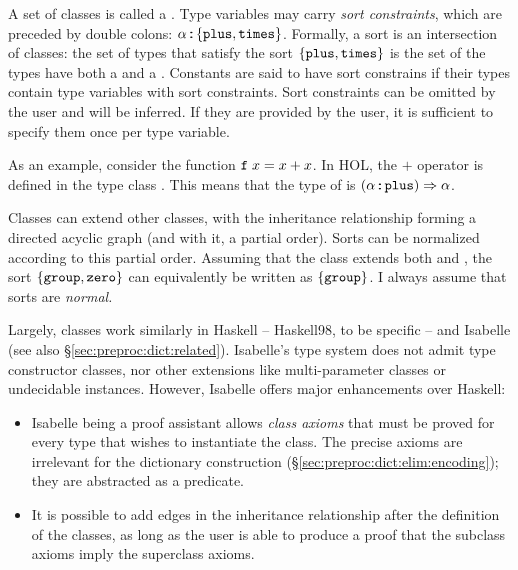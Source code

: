 A set of classes is called a .
Type variables may carry \emph{sort constraints}, which are preceded by double colons: $\alpha \mathbin{:\!\!:} \{ \texttt{\textup{plus}}, \texttt{\textup{times}} \}$.
Formally, a sort is an intersection of classes: the set of types that satisfy the sort $\{ \texttt{\textup{plus}}, \texttt{\textup{times}} \}$ is the set of the types have both a  and a  .
Constants are said to have sort constrains if their types contain type variables with sort constraints.
Sort constraints can be omitted by the user and will be inferred.
If they are provided by the user, it is sufficient to specify them once per type variable.

As an example, consider the function $\texttt{\textup{f}}\;x = x + x$.
In HOL, the $+$ operator is defined in the type class .
This means that the type of  is $(\alpha \mathbin{:\!\!:} \texttt{\textup{plus}}) \Rightarrow \alpha$.

Classes can extend other classes, with the inheritance relationship forming a directed acyclic graph (and with it, a partial order).
Sorts can be normalized according to this partial order.
Assuming that the class  extends both  and , the sort $\{ \texttt{\textup{group}}, \texttt{\textup{zero}} \}$ can equivalently be written as $\{ \texttt{\textup{group}} \}$.
I always assume that sorts are \emph{normal.}

Largely, classes work similarly in Haskell -- Haskell98, to be specific -- and Isabelle (see also §\ref{sec:preproc:dict:related}).
Isabelle's type system does not admit type constructor classes, nor other extensions like multi-parameter classes or undecidable instances.
However, Isabelle offers major enhancements over Haskell:
\begin{itemize}
  \item
    Isabelle being a proof assistant allows \emph{class axioms} that must be proved for every type that wishes to instantiate the class.
    The precise axioms are irrelevant for the dictionary construction (§\ref{sec:preproc:dict:elim:encoding}); they are abstracted as a predicate.
  \item
    It is possible to add edges in the inheritance relationship after the definition of the classes, as long as the user is able to produce a proof that the subclass axioms imply the superclass axioms.
\end{itemize}


